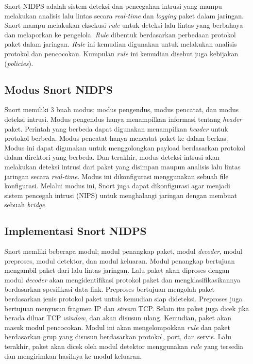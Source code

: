     Snort NIDPS adalah sistem deteksi dan pencegahan intrusi yang mampu melakukan analisis lalu lintas secara \emph{real-time} dan \emph{logging} paket dalam jaringan. Snort mampu melakukan eksekusi \emph{rule} untuk deteksi lalu lintas yang berbahaya dan melaporkan ke pengelola. \emph{Rule} dibentuk berdasarkan perbedaan protokol paket dalam jaringan. \emph{Rule} ini kemudian digunakan untuk melakukan analisis protokol dan pencocokan. Kumpulan \emph{rule} ini kemudian disebut juga kebijakan (\emph{policies}). 

  \subsection{Modus Snort NIDPS}

    Snort memiliki 3 buah modus; modus pengendus, modus pencatat, dan modus deteksi intrusi. Modus pengendus hanya menampilkan informasi tentang \emph{header} paket. Perintah yang berbeda dapat digunakan menampilkan \emph{header} untuk protokol berbeda. Modus pencatat hanya mencatat paket ke dalam berkas. Modus ini dapat digunakan untuk menggolongkan payload berdasarkan protokol dalam direktori yang berbeda. Dan terakhir, modus deteksi intrusi akan melakukan deteksi intrusi dari paket yang disimpan maupun analisis lalu lintas jaringan secara \emph{real-time}. Modus ini dikonfigurasi menggunakan sebuah file konfigurasi. Melalui modus ini, Snort juga dapat dikonfigurasi agar menjadi sistem pencegah intrusi (NIPS) untuk menghalangi jaringan dengan membuat sebuah \emph{bridge}.

  \subsection{Implementasi Snort NIDPS}

    Snort memliki beberapa modul; modul penangkap paket, modul \emph{decoder}, modul preproses, modul detektor, dan modul keluaran. Modul penangkap bertujuan mengambil paket dari lalu lintas jaringan. Lalu paket akan diproses dengan modul \emph{decoder} akan mengidentifikasi protokol paket dan mengklasifikasikannya berdasarkan spesifikasi data-link. Preproses bertujuan mengolah paket berdasarkan jenis protokol paket untuk kemudian siap dideteksi. Preproses juga bertujuan menyusun fragmen IP dan \emph{stream} TCP. Selain itu paket juga dicek jika berada diluar TCP \emph{window}, dan akan disusun ulang. Kemudian, paket akan masuk modul pencocokan. Modul ini akan mengelompokkan \emph{rule} dan paket berdasarkan grup yang disusun berdasarkan protokol, port, dan servis. Lalu terakhir, paket akan dicek oleh modul detektor menggunakan \emph{rule} yang tersedia dan mengirimkan hasilnya ke modul keluaran.

